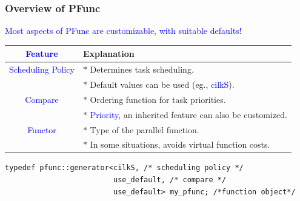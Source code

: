 \documentclass{beamer}
\newcommand{\tablefont}{\fontsize{8}{13}\selectfont}
\begin{document}
\begin{frame}[fragile]
\frametitle{Overview of PFunc}

\tablefont
\begin{center}
\textcolor{blue}{Most aspects of PFunc are customizable, with suitable defaults!}
\end{center}

\begin{center}
\tablefont
\begin{tabular}{|c|l|}
\hline
\textcolor{blue}{Feature} & Explanation \\
\hline
\textcolor{blue}{Scheduling Policy} & $\ast{}$ Determines task scheduling. \\
          & $\ast{}$ Default values can be used (eg., \textcolor{blue}{cilkS}). \\
\hline
\textcolor{blue}{Compare} & $\ast{}$ Ordering function for task priorities. \\
      & $\ast{}$ \textcolor{blue}{Priority}, an inherited feature can also be customized. \\
\hline
\textcolor{blue}{Functor} & $\ast{}$ Type of the parallel function. \\
                          & $\ast{}$ In some situations, avoids virtual function costs. \\
\hline
\end{tabular}
\end{center}

\normalsize

\begin{center}
\begin{minipage}{0.6\textwidth}
\begin{lstlisting}
typedef pfunc::generator<cilkS, /* scheduling policy */
                         use_default, /* compare */
                         use_default> my_pfunc; /*function object*/
\end{lstlisting}
\end{minipage}
\end{center}

\end{frame}
\end{document}
